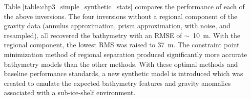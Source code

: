 Table \ref{table:chp3_simple_synthetic_stats} compares the performance of each of the above inversions. The four inversions without a regional component of the gravity data (annulus approximation, prism approximation, with noise, and resampled), all recovered the bathymetry with an RMSE of $\sim$~10~m. With the regional component, the lowest RMS was raised to 37~m. The constraint point minimization method of regional separation produced significantly more accurate bathymetry models than the other methods. With these optimal methods and baseline performance standards, a new synthetic model is introduced which was created to emulate the expected bathymetry features and gravity anomalies associated with a sub-ice-shelf environment.

